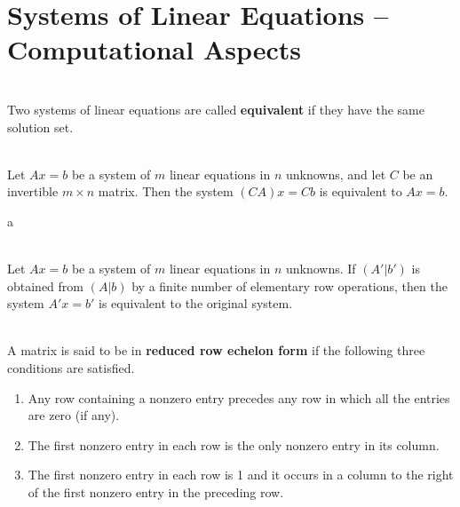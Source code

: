 \section{Systems of Linear Equations -- Computational Aspects}

\begin{definition}
	\hfill\\
	Two systems of linear equations are called \textbf{equivalent} if they have the same solution set.
\end{definition}

\begin{theorem}
	\hfill\\
	Let $Ax = b$ be a system of $m$ linear equations in $n$ unknowns, and let $C$ be an invertible $m \times n$ matrix. Then the system $(CA)x = Cb$ is equivalent to $Ax = b$.
\end{theorem}a

\begin{corollary}
	\hfill\\
	Let $Ax = b$ be a system of $m$ linear equations in $n$ unknowns. If $(A'|b')$ is obtained from $(A|b)$ by a finite number of elementary row operations, then the system $A'x = b'$ is equivalent to the original system.
\end{corollary}

\begin{definition}
	\hfill\\
	A matrix is said to be in \textbf{reduced row echelon form} if the following three conditions are satisfied.

	\begin{enumerate}
		\item Any row containing a nonzero entry precedes any row in which all the entries are zero (if any).

		\item The first nonzero entry in each row is the only nonzero entry in its column.

		\item The first nonzero entry in each row is 1 and it occurs in a column to the right of the first nonzero entry in the preceding row.
	\end{enumerate}
\end{definition}

